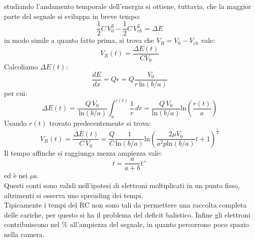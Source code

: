 studiando l'andamento temporale dell'energia si ottiene, tuttavia, che la maggior parte del segnale si sviluppa in breve tempo:
\begin{equation*}
\frac{1}{2} C \, V_0^2 - \frac{1}{2} C \, V_{ch}^2 = \Delta E
\end{equation*}
in modo simile a quanto fatto prima, si trova che $V_R = V_0 - V_{ch}$ vale:
\begin{equation*}
V_R(t) = \frac{\Delta E(t)}{C V_0}
\end{equation*}
Calcoliamo $\Delta E(t)$:
\begin{equation*}
\frac{dE}{dx} = Q \epsilon = Q \frac{V_0}{r \, \text{ln}(b/a)}
\end{equation*}
per cui:
\begin{equation*}
\Delta E(t) = \frac{Q \, V_0}{ \, \text{ln}(b/a)} \int_a^{r(t)} \frac{1}{r} \, dr  =  \frac{Q \,V_0}{ \text{ln}(b/a)} \text{ln}\left(\frac{r(t)}{a}\right)
\end{equation*}
Usando $r(t)$ trovato predecentemente si trova:
\begin{equation*}
V_R(t) =\frac{ \Delta E(t)}{C \, V_0} = \frac{Q}{C} \frac{1}{\text{ln}(b/a)} \text{ln} \left(\frac{2\mu V_0}{a^2 p \text{ln}(b/a)}t+1\right)^{\frac{1}{2}}
\end{equation*}
Il tempo affinche si raggiunga mezza ampiezza vale:
\begin{equation*}
t = \frac{a}{a+b} t^+
\end{equation*}
ed \`e nei $\mu$s.\\
Questi conti sono validi nell'ipotesi di elettroni moltiplicati in un punto fisso, altrimenti si osserva uno spreading dei tempi.\\
Tipicamente i tempi del RC non sono tali da permettere una raccolta completa delle cariche, per questo si ha il problema del deficit balistico.
Infine gli elettroni contribuiscono nel \% all'ampiezza del segnale, in quanto percorrono poco spazio nella camera.
